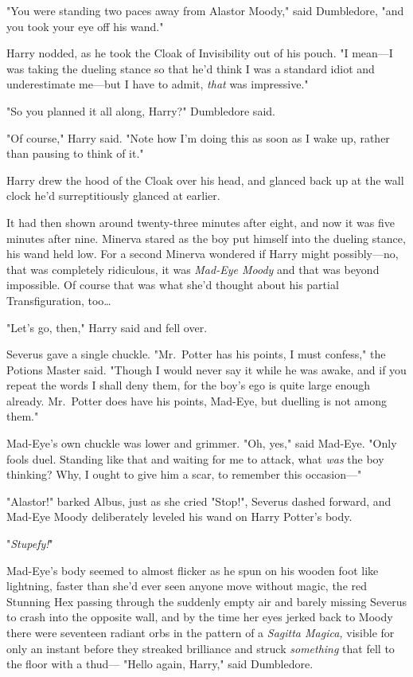 "You were standing two paces away from Alastor Moody," said Dumbledore, "and you took your eye off his wand."

Harry nodded, as he took the Cloak of Invisibility out of his pouch. "I mean---I was taking the dueling stance so that he'd think I was a standard idiot and underestimate me---but I have to admit, \emph{that} was impressive."

"So you planned it all along, Harry?" Dumbledore said.

"Of course," Harry said. "Note how I'm doing this as soon as I wake up, rather than pausing to think of it."

Harry drew the hood of the Cloak over his head, and glanced back up at the wall clock he'd surreptitiously glanced at earlier.

It had then shown around twenty-three minutes after eight, and now it was five minutes after nine.
\sbreak
Minerva stared as the boy put himself into the dueling stance, his wand held low. For a second Minerva wondered if Harry might possibly---no, that was completely ridiculous, it was \emph{Mad-Eye Moody} and that was beyond impossible. Of course that was what she'd thought about his partial Transfiguration, too{\ldots}

"Let's go, then," Harry said and fell over.

Severus gave a single chuckle. "Mr.~Potter has his points, I must confess," the Potions Master said. "Though I would never say it while he was awake, and if you repeat the words I shall deny them, for the boy's ego is quite large enough already. Mr.~Potter does have his points, Mad-Eye, but duelling is not among them."

Mad-Eye's own chuckle was lower and grimmer. "Oh, yes," said Mad-Eye. "Only fools duel. Standing like that and waiting for me to attack, what \emph{was} the boy thinking? Why, I ought to give him a scar, to remember this occasion---"

"Alastor!" barked Albus, just as she cried "Stop!", Severus dashed forward, and Mad-Eye Moody deliberately leveled his wand on Harry Potter's body.

"\emph{Stupefy!}"

Mad-Eye's body seemed to almost flicker as he spun on his wooden foot like lightning, faster than she'd ever seen anyone move without magic, the red Stunning Hex passing through the suddenly empty air and barely missing Severus to crash into the opposite wall, and by the time her eyes jerked back to Moody there were seventeen radiant orbs in the pattern of a \emph{Sagitta Magica,} visible for only an instant before they streaked brilliance and struck \emph{something} that fell to the floor with a thud---
\sbreak
"Hello again, Harry," said Dumbledore.

